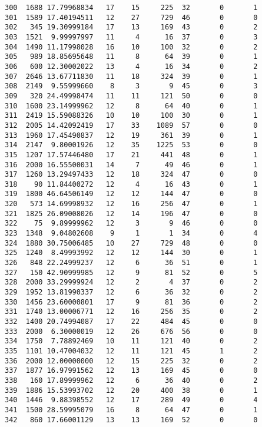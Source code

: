 \documentclass[
  letterpaper,
  DIV=11,
  numbers=noendperiod]{scrreprt}
\begin{document}
\begin{verbatim}
300  1688 17.79968834   17    15     225  32       0       1
301  1589 17.40194511   12    27     729  46       0       0
302   345 19.30999184   17    13     169  43       0       2
303  1521  9.99997997   11     4      16  37       0       3
304  1490 11.17998028   16    10     100  32       0       2
305   989 18.85695648   11     8      64  39       0       1
306   600 12.30002022   13     4      16  34       0       2
307  2646 13.67711830   11    18     324  39       0       1
308  2149  9.55999660    8     3       9  45       0       3
309   320 24.49998474   11    11     121  50       0       0
310  1600 23.14999962   12     8      64  40       0       1
311  2419 15.59088326   10    10     100  30       0       1
312  2005 14.42092419   17    33    1089  57       0       0
313  1960 17.45490837   12    19     361  39       0       1
314  2147  9.80001926   12    35    1225  53       0       0
315  1207 17.57446480   17    21     441  48       0       1
316  2000 16.55500031   14     7      49  46       0       1
317  1260 13.29497433   12    18     324  47       0       0
318    90 11.84400272   12     4      16  43       0       1
319  1800 46.64506149   12    12     144  47       0       0
320   573 14.69998932   12    16     256  47       0       1
321  1825 26.09008026   12    14     196  47       0       0
322    75  9.89999962   12     3       9  46       0       0
323  1348  9.04802608    9     1       1  34       0       4
324  1880 30.75006485   10    27     729  48       0       0
325  1240  8.49993992   12    12     144  30       0       1
326   848 22.24999237   12     6      36  51       0       1
327   150 42.90999985   12     9      81  52       0       5
328  2000 33.29999924   12     2       4  37       0       2
329  1952 13.81990337   12     6      36  32       0       2
330  1456 23.60000801   17     9      81  36       0       2
331  1740 13.00006771   12    16     256  35       0       2
332  1400 20.74994087   17    22     484  45       0       0
333  2000  6.30000019   12    26     676  56       0       0
334  1750  7.78892469   10    11     121  40       0       2
335  1101 10.47004032   12    11     121  45       1       2
336  2000 12.00000000   12    15     225  32       0       2
337  1877 16.97991562   12    13     169  45       0       0
338   160 17.89999962   12     6      36  40       0       2
339  1886 15.53993702   12    20     400  38       0       1
340  1446  9.88398552   12    17     289  49       0       4
341  1500 28.59995079   16     8      64  47       0       1
342   860 17.66001129   13    13     169  52       0       0

\end{verbatim}
\end{document}

